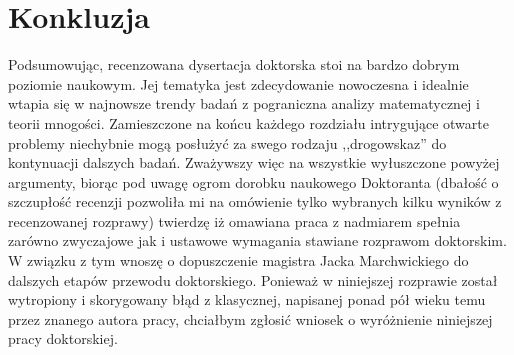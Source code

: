 \documentclass[12pt]{article}
\begin{document}
\section{Konkluzja}
Podsumowując, recenzowana dysertacja doktorska stoi
na bardzo dobrym poziomie naukowym. Jej tematyka jest
zdecydowanie nowoczesna i idealnie wtapia się w najnowsze
trendy badań z pograniczna analizy matematycznej i teorii mnogości.
Zamieszczone na końcu każdego rozdziału intrygujące otwarte problemy
niechybnie mogą posłużyć za swego rodzaju ,,drogowskaz'' 
do kontynuacji dalszych badań.
  Zważywszy więc na wszystkie wyłuszczone powyżej argumenty,
biorąc pod uwagę ogrom dorobku naukowego Doktoranta (dbałość o 
szczupłość recenzji pozwoliła mi na omówienie tylko wybranych
kilku wyników z recenzowanej rozprawy) twierdzę iż omawiana 
praca z nadmiarem spełnia zarówno zwyczajowe jak i ustawowe
wymagania stawiane rozprawom doktorskim. W związku z tym
wnoszę o dopuszczenie magistra Jacka Marchwickiego do dalszych
etapów przewodu doktorskiego.
  Ponieważ w niniejszej rozprawie został wytropiony i 
skorygowany błąd z klasycznej, napisanej ponad pół wieku temu przez znanego
autora pracy, chciałbym zgłosić 
wniosek o wyróżnienie niniejszej pracy doktorskiej.
\end{document}
